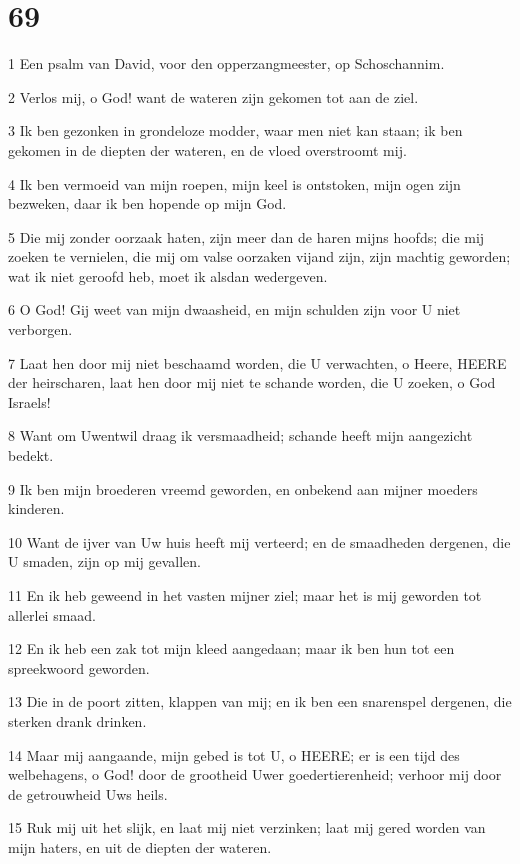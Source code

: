 \chapter{69}

\par 1 Een psalm van David, voor den opperzangmeester, op Schoschannim.
\par 2 Verlos mij, o God! want de wateren zijn gekomen tot aan de ziel.
\par 3 Ik ben gezonken in grondeloze modder, waar men niet kan staan; ik ben gekomen in de diepten der wateren, en de vloed overstroomt mij.
\par 4 Ik ben vermoeid van mijn roepen, mijn keel is ontstoken, mijn ogen zijn bezweken, daar ik ben hopende op mijn God.
\par 5 Die mij zonder oorzaak haten, zijn meer dan de haren mijns hoofds; die mij zoeken te vernielen, die mij om valse oorzaken vijand zijn, zijn machtig geworden; wat ik niet geroofd heb, moet ik alsdan wedergeven.
\par 6 O God! Gij weet van mijn dwaasheid, en mijn schulden zijn voor U niet verborgen.
\par 7 Laat hen door mij niet beschaamd worden, die U verwachten, o Heere, HEERE der heirscharen, laat hen door mij niet te schande worden, die U zoeken, o God Israels!
\par 8 Want om Uwentwil draag ik versmaadheid; schande heeft mijn aangezicht bedekt.
\par 9 Ik ben mijn broederen vreemd geworden, en onbekend aan mijner moeders kinderen.
\par 10 Want de ijver van Uw huis heeft mij verteerd; en de smaadheden dergenen, die U smaden, zijn op mij gevallen.
\par 11 En ik heb geweend in het vasten mijner ziel; maar het is mij geworden tot allerlei smaad.
\par 12 En ik heb een zak tot mijn kleed aangedaan; maar ik ben hun tot een spreekwoord geworden.
\par 13 Die in de poort zitten, klappen van mij; en ik ben een snarenspel dergenen, die sterken drank drinken.
\par 14 Maar mij aangaande, mijn gebed is tot U, o HEERE; er is een tijd des welbehagens, o God! door de grootheid Uwer goedertierenheid; verhoor mij door de getrouwheid Uws heils.
\par 15 Ruk mij uit het slijk, en laat mij niet verzinken; laat mij gered worden van mijn haters, en uit de diepten der wateren.
